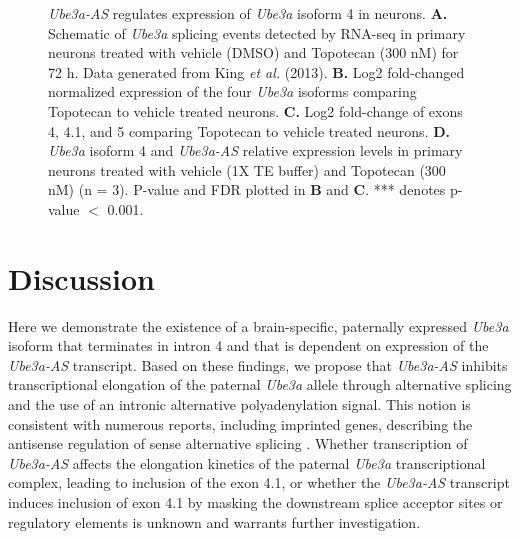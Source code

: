 \begin{figure}
  \centering
  \caption{\textit{Ube3a-AS} regulates expression of \textit{Ube3a} isoform 4 in neurons. \textbf{A.} Schematic of \textit{Ube3a} splicing events detected by RNA-seq in primary neurons treated with vehicle (DMSO) and Topotecan (300 nM) for 72 h. Data generated from King \textit{et al.} (2013). \textbf{B.} Log2 fold-changed normalized expression of the four \textit{Ube3a} isoforms comparing Topotecan to vehicle treated neurons. \textbf{C.} Log2 fold-change of exons 4, 4.1, and 5 comparing Topotecan to vehicle treated neurons. \textbf{D.} \textit{Ube3a} isoform 4 and \textit{Ube3a-AS} relative expression levels in primary neurons treated with vehicle (1X TE buffer) and Topotecan (300 nM) (n = 3). P-value and FDR plotted in \textbf{B} and \textbf{C}. *** denotes p-value $<$ 0.001.}
  \label{topotecan treated neurons}
\end{figure}

\section{Discussion}

Here we demonstrate the existence of a brain-specific, paternally expressed \textit{Ube3a} isoform that terminates in intron 4 and that is dependent on expression of the \textit{Ube3a-AS} transcript.  Based on these findings, we propose that \textit{Ube3a-AS} inhibits transcriptional elongation of the paternal \textit{Ube3a} allele through alternative splicing and the use of an intronic alternative polyadenylation signal.  This notion is consistent with numerous reports, including imprinted genes, describing the antisense regulation of sense alternative splicing \cite{MacIsaac2011,Morrissy2011}.  Whether transcription of \textit{Ube3a-AS} affects the elongation kinetics of the paternal \textit{Ube3a} transcriptional complex, leading to inclusion of the exon 4.1, or whether the \textit{Ube3a-AS} transcript induces inclusion of exon 4.1 by masking the downstream splice acceptor sites or regulatory elements is unknown and warrants further investigation.

